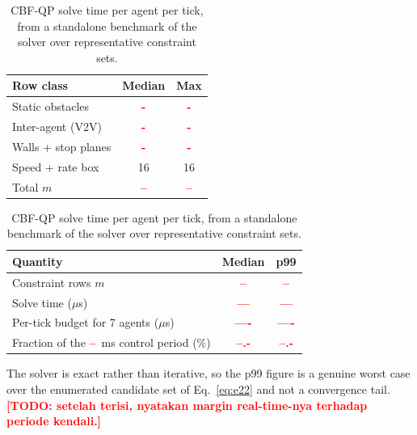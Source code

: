 \documentclass[10pt,letterpaper]{article}
\newcommand{\val}[1]{\textcolor{red}{\textbf{#1}}}
\newcommand{\TODO}[1]{\textcolor{red}{\textbf{[TODO: #1]}}}
\begin{document}
\begin{table}[tbp]
    \centering
    \begin{minipage}[t]{0.46\textwidth}\centering\footnotesize
        \caption{Constraint-set size actually solved, sampled over all ticks. Feeds the
            $O(m^2)$ cost of Table~\ref{tab:cost}.}
        \label{tab:rows}
        \begin{tabular}{lcc}
            \toprule
            \textbf{Row class}  & \textbf{Median} & \textbf{Max} \\
            \midrule
            Static obstacles    & \val{-}         & \val{-}      \\
            Inter-agent (V2V)   & \val{-}         & \val{-}      \\
            Walls + stop planes & \val{-}         & \val{-}      \\
            Speed + rate box    & 16              & 16           \\
            \midrule
            Total $m$           & \val{--}        & \val{--}     \\
            \bottomrule
        \end{tabular}
    \end{minipage}\hfill
    \begin{minipage}[t]{0.50\textwidth}\centering\footnotesize
        \caption{CBF-QP solve time per agent per tick, from a standalone benchmark of the
            solver over representative constraint sets.}
        \label{tab:cost}
        \begin{tabular}{lcc}
            \toprule
            \textbf{Quantity}                               & \textbf{Median} & \textbf{p99} \\
            \midrule
            Constraint rows $m$                             & \val{--}        & \val{--}     \\
            Solve time ($\mu$s)                             & \val{---}       & \val{---}    \\
            Per-tick budget for 7 agents ($\mu$s)           & \val{----}      & \val{----}   \\
            Fraction of the \val{--}~ms control period (\%) & \val{--.-}      & \val{--.-}   \\
            \bottomrule
        \end{tabular}
    \end{minipage}
\end{table}

The solver is exact rather than iterative, so the p99 figure is a genuine worst case over
the enumerated candidate set of Eq.~\eqref{eq:e22} and not a convergence tail.
\TODO{setelah terisi, nyatakan margin real-time-nya terhadap periode kendali.}
\end{document}
